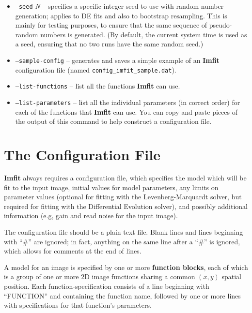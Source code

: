 \documentclass[10pt,a4paper,article]{memoir}
\newcommand{\imfit}{\textbf{Imfit}}
\newcommand{\Imfit}{\textbf{Imfit}}
\begin{document}
\begin{itemize}
\item \texttt{--seed} \textit{N} -- specifies a specific integer seed to use with
random number generation; applies to DE fits and also to bootstrap resampling. This is
mainly for testing purposes, to ensure that the same sequence of pseudo-random
numbers is generated. (By default, the current system time is used as a seed,
ensuring that no two runs have the same random seed.)

\bigskip

\item \texttt{--sample-config} -- generates and saves a simple example
of an \imfit{} configuration file (named
\texttt{config\_imfit\_sample.dat}).

\item \texttt{--list-functions} -- list all the functions \imfit{} can use.

\item \texttt{--list-parameters} -- list all the individual parameters (in correct order)
for each of the functions that \imfit{} can use. You can copy and paste pieces of the output
of this command to help construct a configuration file.
\end{itemize}




\newpage

\chapter{The Configuration File}\label{sec:configfile}

\Imfit{} always requires a configuration file, which specifies the model
which will be fit to the input image, initial values for model parameters, any
limits on parameter values (optional for fitting with the Levenberg-Marquardt
solver, but required for fitting with the Differential Evolution solver), and
possibly additional information (e.g, gain and read noise for the input image).

The configuration file should be a plain text file. Blank lines and
lines beginning with ``\#'' are ignored; in fact, anything on the same line after a
``\#'' is ignored, which allows for comments at the end of lines.

A model for an image is specified by one or more \textbf{function blocks}, each of
which is a group of one or more 2D image functions sharing a common $(x,y)$
spatial position. Each function-specification consists of a line beginning with
``FUNCTION'' and containing the function name, followed by one or more lines
with specifications for that function's parameters.
\end{document}
